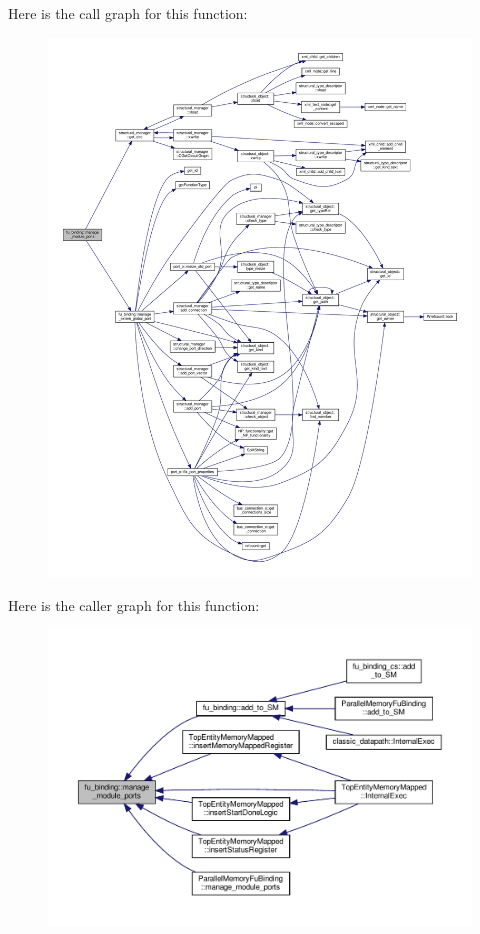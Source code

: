 Here is the call graph for this function\+:
\nopagebreak
\begin{figure}[H]
\begin{center}
\leavevmode
\includegraphics[width=350pt]{d8/d04/classfu__binding_a22ec0ba3bb337532e0fca26e2625085e_cgraph}
\end{center}
\end{figure}
Here is the caller graph for this function\+:
\nopagebreak
\begin{figure}[H]
\begin{center}
\leavevmode
\includegraphics[width=350pt]{d8/d04/classfu__binding_a22ec0ba3bb337532e0fca26e2625085e_icgraph}
\end{center}
\end{figure}
\mbox{\label{classfu__binding_a4265728bc9c78559b1bc881119eb5fdc}} 
